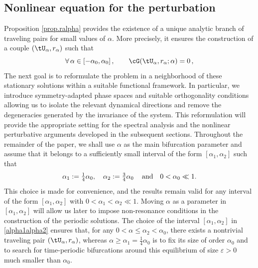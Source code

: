 \documentclass[a4paper,reqno,10pt]{article}
\begin{document}
\subsection{Nonlinear equation for the perturbation}
Proposition \ref{prop.ralpha} provides the existence of a unique analytic branch of traveling pairs for small values of $\alpha$. More precisely, it ensures the construction of a couple $(\tU_\alpha, r_\alpha)$ such that  
\begin{equation*}
   \forall \, \alpha \in [-\alpha_0,\alpha_0] \,, \qquad \cG(\tU_\alpha,r_\alpha;\alpha)=0 \,,
\end{equation*}
The next goal is to reformulate the problem in a neighborhood of these stationary solutions within a suitable functional framework. In particular, we introduce symmetry-adapted phase spaces and suitable orthogonality conditions allowing us to isolate the relevant dynamical directions and remove the degeneracies generated by the invariance of the system. This reformulation will provide the appropriate setting for the spectral analysis and the nonlinear perturbative arguments developed in the subsequent sections.
 Throughout the remainder of the paper, we shall use \(\alpha\) as the main bifurcation parameter and assume that it belongs to a sufficiently small interval of the form $[\alpha_{1},\alpha_{2}]$ such that
\begin{equation}\label{alpha1alpha2}
	  \alpha_1:=\tfrac14 \alpha_{0} ,\quad  \alpha_{2} := \tfrac34 \alpha_{0} \,\quad\hbox{and}\quad  0<\alpha_{0} \ll 1.
\end{equation}
This choice is made for convenience, and the results remain valid for any interval of the form $[\alpha_1,\alpha_2]$ with $0<\alpha_1<\alpha_2\ll1.$ 
Moving $\alpha$ as a parameter in $[\alpha_{1},\alpha_{2}]$ will allow us later to impose non-resonance conditions in the construction of the periodic solutions.
The choice of the interval $[\alpha_{1},\alpha_{2}]$ in \eqref{alpha1alpha2} ensures that, for any $0<\alpha\leq \alpha_{2}<\alpha_{0}$, there exists a nontrivial traveling pair $(\tU_{\alpha},r_{\alpha})$, whereas $\alpha\geq \alpha_{1}=\tfrac14 \alpha_{0}$ is to fix its size of order $\alpha_{0}$ and to search for time-periodic bifurcations around this equilibrium of size $\varepsilon>0$ much smaller than $\alpha_{0}$.

\medskip
\end{document}
